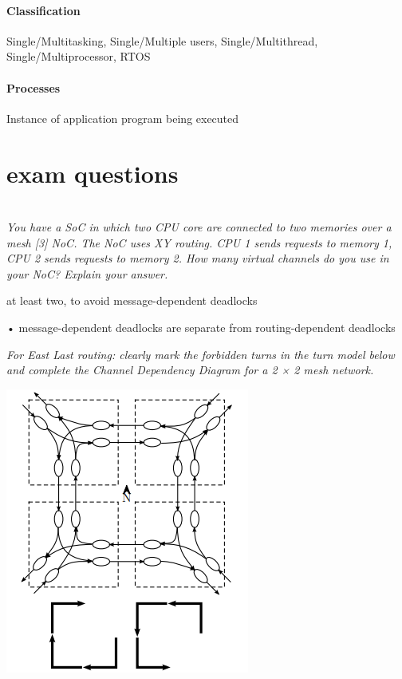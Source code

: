 \documentclass[fontsize=8pt]{scrartcl}
\begin{document}
\begin{multicols*}{4}
\paragraph{Classification}

Single/Multitasking, Single/Multiple users, Single/Multithread, Single/Multiprocessor, RTOS

\paragraph{Processes}Instance of application program being executed

\section{exam questions} \mbox{} \\
\textit{You have a SoC in which two CPU core are connected to two memories over a mesh [3] NoC. The NoC uses XY routing. CPU 1 sends requests to memory 1, CPU 2 sends requests to memory 2. How many virtual channels do you use in your NoC? Explain your answer.}

at least two, to avoid message-dependent deadlocks

• message-dependent deadlocks are separate from routing-dependent deadlocks

\textit{For East Last routing: clearly mark the forbidden turns in the turn model below and complete the Channel Dependency Diagram for a 2 × 2 mesh network.}

\begin{center}
  \centering
  \includegraphics[width=0.8\linewidth]{img/east last routing.png}
  \label{fig:east-last-routing}
\end{center}


\end{multicols*}
\end{document}
